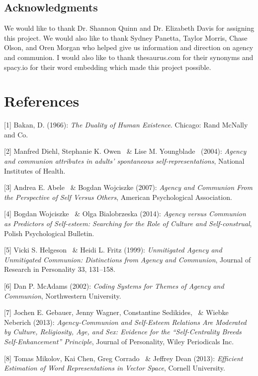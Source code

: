 \documentclass{article}
\begin{document}
\subsection*{Acknowledgments}

We would like to thank Dr. Shannon Quinn and Dr. Elizabeth Davis for assigning this project. We would also like to thank Sydney Panetta, Taylor Morris, Chase Olson, and Oren Morgan who helped give us information and direction on agency and communion. I would also like to thank thesaurus.com for their synonyms and spacy.io for their word embedding which made this project possible.

\section*{References}

\medskip

\small
[1] Bakan, D. (1966): {\it The Duality of Human Existence}. Chicago: Rand McNally and Co. 

[2] Manfred Diehl, Stephanie K. Owen \ \& Lise M. Youngblade \ (2004): {\it Agency and communion attributes in adults’ spontaneous self-representations}, National Institutes of Health.

[3] Andrea E. Abele \ \& Bogdan Wojciszke (2007): {\it Agency and Communion From the Perspective of Self Versus Others}, American Psychological Association.

[4] Bogdan Wojciszke \ \& Olga Bialobrzeska (2014): {\it Agency versus Communion as Predictors of Self-esteem: Searching for the Role of Culture and Self-construal}, Polish Psychological Bulletin.

[5] Vicki S. Helgeson \ \& Heidi L. Fritz (1999): {\it Unmitigated Agency and Unmitigated Communion: Distinctions
from Agency and Communion}, Journal of Research in Personality 33, 131–158.

[6] Dan P. McAdams (2002): {\it Coding Systems for Themes of Agency and Communion}, Northwestern University.

[7] Jochen E. Gebauer, Jenny Wagner,
Constantine Sedikides, \ \& Wiebke Neberich (2013): {\it Agency-Communion and Self-Esteem Relations Are Moderated by Culture, Religiosity, Age, and Sex: Evidence for the “Self-Centrality Breeds Self-Enhancement” Principle}, Journal of Personality, Wiley Periodicals Inc. 

[8] Tomas Mikolov, Kai Chen, Greg Corrado \ \& Jeffrey Dean (2013): {\it Efficient Estimation of Word Representations in Vector Space}, Cornell University.
\end{document}

